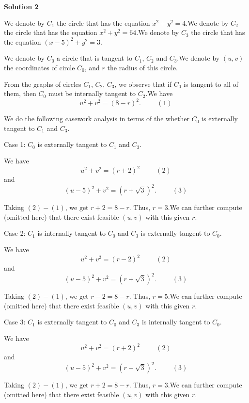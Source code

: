\begin{enumerate}
\textbf{Solution 2}

We denote by $C_1$ the circle that has the equation $x^2 + y^2 = 4$.We denote by $C_2$ the circle that has the equation $x^2 + y^2 = 64$.We denote by $C_3$ the circle that has the equation $(x-5)^2 + y^2 = 3$.

 We denote by $C_0$ a circle that is tangent to $C_1$, $C_2$ and $C_3$.We denote by $\left( u, v \right)$ the coordinates of circle $C_0$, and $r$ the radius of this circle.

 From the graphs of circles $C_1$, $C_2$, $C_3$, we observe that if $C_0$ is tangent to all of them, then $C_0$ must be internally tangent to $C_2$.We have
 \[ u^2 + v^2 = \left( 8 - r \right)^2 . \hspace{1cm} (1) \]

 We do the following casework analysis in terms of the whether $C_0$ is externally tangent to $C_1$ and $C_3$.

 Case 1: $C_0$ is externally tangent to $C_1$ and $C_3$.

 We have
 \[ u^2 + v^2 = \left( r + 2 \right)^2   \hspace{1cm} (2) \]and
 \[ (u-5)^2 + v^2 = \left( r + \sqrt{3} \right)^2 . \hspace{1cm} (3) \]

 Taking $(2) - (1)$, we get $r + 2 = 8 - r$. Thus, $r = 3$.We can further compute (omitted here) that there exist feasible $(u,v)$ with this given $r$.

 Case 2: $C_1$ is internally tangent to $C_0$ and $C_3$ is externally tangent to $C_0$.

 We have
 \[ u^2 + v^2 = \left( r - 2 \right)^2  \hspace{1cm} (2) \]and
 \[ (u-5)^2 + v^2 = \left( r + \sqrt{3} \right)^2 . \hspace{1cm} (3) \]

 Taking $(2) - (1)$, we get $r - 2 = 8 - r$. Thus, $r = 5$.We can further compute (omitted here) that there exist feasible $(u,v)$ with this given $r$.

 Case 3: $C_1$ is externally tangent to $C_0$ and $C_3$ is internally tangent to $C_0$.

 We have
 \[ u^2 + v^2 = \left( r + 2 \right)^2  \hspace{1cm} (2) \]and
 \[ (u-5)^2 + v^2 = \left( r - \sqrt{3} \right)^2 . \hspace{1cm} (3) \]

 Taking $(2) - (1)$, we get $r + 2 = 8 - r$. Thus, $r = 3$.We can further compute (omitted here) that there exist feasible $(u,v)$ with this given $r$.


\end{enumerate}
